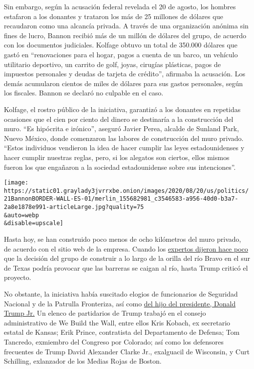 Sin embargo, según la acusación federal revelada el 20 de agosto, los
hombres estafaron a los donantes y trataron los más de 25 millones de
dólares que recaudaron como una alcancía privada. A través de una
organización anónima sin fines de lucro, Bannon recibió más de un millón
de dólares del grupo, de acuerdo con los documentos judiciales. Kolfage
obtuvo un total de 350.000 dólares que gastó en ``renovaciones para el
hogar, pagos a cuenta de un barco, un vehículo utilitario deportivo, un
carrito de golf, joyas, cirugías plásticas, pagos de impuestos
personales y deudas de tarjeta de crédito'', afirmaba la acusación. Los
demás acumularon cientos de miles de dólares para sus gastos personales,
según los fiscales. Bannon se declaró no culpable en el caso.

Kolfage, el rostro público de la iniciativa, garantizó a los donantes en
repetidas ocasiones que el cien por ciento del dinero se destinaría a la
construcción del muro. ``Es hipócrita e irónico'', aseguró Javier Perea,
alcalde de Sunland Park, Nuevo México, donde comenzaron las labores de
construcción del muro privado. ``Estos individuos vendieron la idea de
hacer cumplir las leyes estadounidenses y hacer cumplir nuestras reglas,
pero, si los alegatos son ciertos, ellos mismos fueron los que engañaron
a la sociedad estadounidense sobre sus intenciones''.

\texttt{[image: https://static01.graylady3jvrrxbe.onion/images/2020/08/20/us/politics/21BannonBORDER-WALL-ES-01/merlin\_155682981\_c3546583-a956-40d0-b3a7-2a8e1878e991-articleLarge.jpg?quality=75\\\&auto=webp\\\&disable=upscale]}

Hasta hoy, se han construido poco menos de ocho kilómetros del muro
privado, de acuerdo con el sitio web de la empresa. Cuando los
\href{https://www.propublica.org/article/he-built-a-privately-funded-border-wall-its-already-at-risk-of-falling-down-if-not-fixed}{expertos
dijeron hace poco} que la decisión del grupo de construir a lo largo de
la orilla del río Bravo en el sur de Texas podría provocar que las
barreras se caigan al río, hasta Trump criticó el proyecto.

No obstante, la iniciativa había suscitado elogios de funcionarios de
Seguridad Nacional y de la Patrulla Fronteriza, así como
\href{https://twitter.com/KFILE/status/1296470804058832899?s=20}{del
hijo del presidente, Donald Trump Jr.} Un elenco de partidarios de Trump
trabajó en el consejo administrativo de We Build the Wall, entre ellos
Kris Kobach, ex secretario estatal de Kansas; Erik Prince, contratista
del Departamento de Defensa; Tom Tancredo, exmiembro del Congreso por
Colorado; así como los defensores frecuentes de Trump David Alexander
Clarke Jr., exalguacil de Wisconsin, y Curt Schilling, exlanzador de los
Medias Rojas de Boston.

